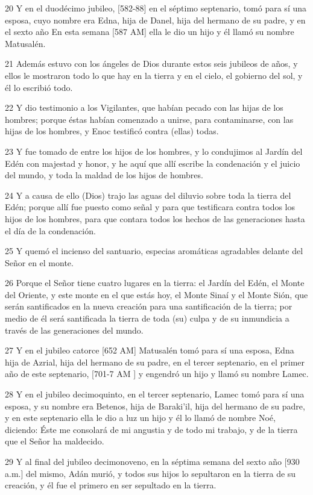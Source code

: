 \par 20 Y en el duodécimo jubileo, [582-88] en el séptimo septenario, tomó para sí una esposa, cuyo nombre era Edna, hija de Danel, hija del hermano de su padre, y en el sexto año En esta semana [587 AM] ella le dio un hijo y él llamó su nombre Matusalén.
\par 21 Además estuvo con los ángeles de Dios durante estos seis jubileos de años, y ellos le mostraron todo lo que hay en la tierra y en el cielo, el gobierno del sol, y él lo escribió todo.
\par 22 Y dio testimonio a los Vigilantes, que habían pecado con las hijas de los hombres; porque éstas habían comenzado a unirse, para contaminarse, con las hijas de los hombres, y Enoc testificó contra (ellas) todas.
\par 23 Y fue tomado de entre los hijos de los hombres, y lo condujimos al Jardín del Edén con majestad y honor, y he aquí que allí escribe la condenación y el juicio del mundo, y toda la maldad de los hijos de hombres.
\par 24 Y a causa de ello (Dios) trajo las aguas del diluvio sobre toda la tierra del Edén; porque allí fue puesto como señal y para que testificara contra todos los hijos de los hombres, para que contara todos los hechos de las generaciones hasta el día de la condenación.
\par 25 Y quemó el incienso del santuario, especias aromáticas agradables delante del Señor en el monte.
\par 26 Porque el Señor tiene cuatro lugares en la tierra: el Jardín del Edén, el Monte del Oriente, y este monte en el que estás hoy, el Monte Sinaí y el Monte Sión, que serán santificados en la nueva creación para una santificación de la tierra; por medio de él será santificada la tierra de toda (su) culpa y de su inmundicia a través de las generaciones del mundo.
\par 27 Y en el jubileo catorce [652 AM] Matusalén tomó para sí una esposa, Edna hija de Azrial, hija del hermano de su padre, en el tercer septenario, en el primer año de este septenario, [701-7 AM ] y engendró un hijo y llamó su nombre Lamec.
\par 28 Y en el jubileo decimoquinto, en el tercer septenario, Lamec tomó para sí una esposa, y su nombre era Betenos, hija de Baraki'il, hija del hermano de su padre, y en este septenario ella le dio a luz un hijo y él lo llamó de nombre Noé, diciendo: Éste me consolará de mi angustia y de todo mi trabajo, y de la tierra que el Señor ha maldecido.
\par 29 Y al final del jubileo decimonoveno, en la séptima semana del sexto año [930 a.m.] del mismo, Adán murió, y todos sus hijos lo sepultaron en la tierra de su creación, y él fue el primero en ser sepultado en la tierra.

